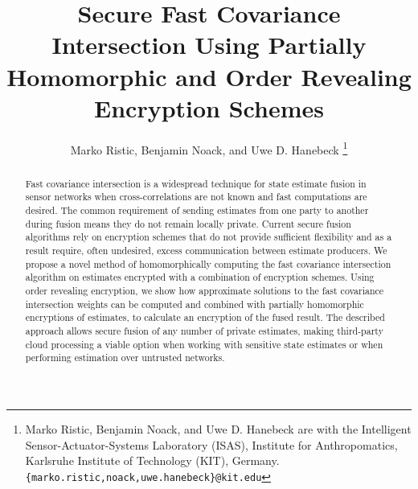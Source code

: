 \documentclass[letterpaper, 10 pt, conference]{ieeeconf}  %
\title{\LARGE \bf
Secure Fast Covariance Intersection Using Partially Homomorphic and Order Revealing Encryption Schemes
}
\author{Marko Ristic, Benjamin Noack, and Uwe D. Hanebeck%
\thanks{Marko Ristic, Benjamin Noack, and Uwe D. Hanebeck are with the Intelligent Sensor-Actuator-Systems Laboratory (ISAS), Institute for Anthropomatics, Karlsruhe Institute of Technology (KIT), Germany.\newline
{\tt\small \{marko.ristic,noack,uwe.hanebeck\}@kit.edu}%
}%
}
\begin{document}
\maketitle
\thispagestyle{empty}
\pagestyle{empty}




\begin{abstract}

Fast covariance intersection is a widespread technique for state estimate fusion in sensor networks when cross-correlations are not known and fast computations are desired. The common requirement of sending estimates from one party to another during fusion means they do not remain locally private. Current secure fusion algorithms rely on encryption schemes that do not provide sufficient flexibility and as a result require, often undesired, excess communication between estimate producers. We propose a novel method of homomorphically computing the fast covariance intersection algorithm on estimates encrypted with a combination of encryption schemes. Using order revealing encryption, we show how approximate solutions to the fast covariance intersection weights can be computed and combined with partially homomorphic encryptions of estimates, to calculate an encryption of the fused result. The described approach allows secure fusion of any number of private estimates, making third-party cloud processing a viable option when working with sensitive state estimates or when performing estimation over untrusted networks.

\end{abstract}



\end{document}
